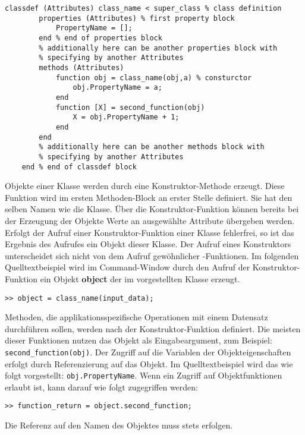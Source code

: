 \begin{lstlisting}[float=h!,caption={Beispiel Klassendefinition},label={Klassendefinition}, frame=none]
	classdef (Attributes) class_name < super_class % class definition
		properties (Attributes) % first property block
			PropertyName = [];
		end % end of properties block
		% additionally here can be another properties block with 
		% specifying by another Attributes
		methods (Attributes) 
			function obj = class_name(obj,a) % consturctor
				obj.PropertyName = a;
			end
			function [X] = second_function(obj)
				X = obj.PropertyName + 1;
			end
		end
		% additionally here can be another methods block with 
		% specifying by another Attributes
	end % end of classdef block
\end{lstlisting}

Objekte einer Klasse werden durch eine Konstruktor-Methode erzeugt. Diese
Funktion wird im ersten Methoden-Block an erster Stelle definiert. Sie hat den
selben Namen wie die Klasse. \"Uber die Konstruktor-Funktion k\"onnen bereits
bei der Erzeugung der Objekte Werte an ausgew\"ahlte Attribute \"ubergeben
werden. Erfolgt der Aufruf einer Konstruktor-Funktion einer Klasse fehlerfrei,
so ist das Ergebnis des Aufrufes ein Objekt dieser Klasse. Der Aufruf eines
Konstruktors unterscheidet sich nicht von dem Aufruf gew\"ohnlicher
\matlab-Funktionen. Im folgenden Quelltextbeispiel wird im Command-Window durch
den Aufruf der Konstruktor-Funktion ein Objekt \textbf{object} der im
 vorgestellten Klasse erzeugt.
\begin{lstlisting}[frame=none]
	>> object = class_name(input_data);
\end{lstlisting}

Methoden, die applikationsspezifische Operationen mit einem Datensatz
durchf\"uhren sollen, werden nach der Konstruktor-Funktion definiert.  Die
meisten dieser Funktionen nutzen das Objekt als Eingabeargument, zum Beispiel:
\lstinline{second_function(obj)}. Der Zugriff auf die Variablen der
Objekteigenschaften erfolgt durch Referenzierung auf das Objekt. Im
Quelltextbeispiel  wird das wie folgt vorgestellt:
\lstinline{obj.PropertyName}. Wenn ein Zugriff auf Objektfunktionen erlaubt ist,
kann darauf wie folgt zugegriffen werden:

\begin{lstlisting}[frame=none]
	>> function_return = object.second_function;
\end{lstlisting}
\noindent Die Referenz auf den Namen des Objektes muss stets erfolgen.

